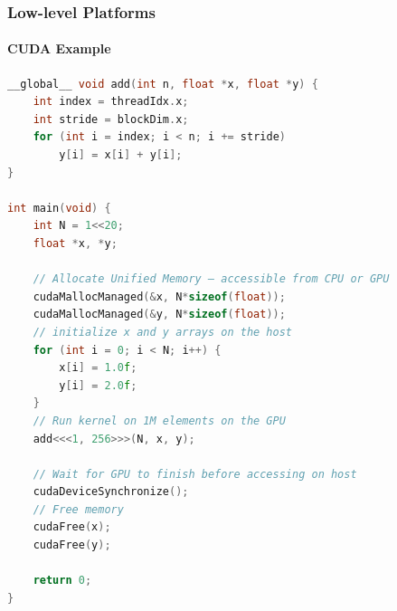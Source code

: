 \documentclass[aspectratio=1610]{beamer}
\begin{document}
\begin{frame}[fragile]
    \frametitle{Low-level Platforms}
    \framesubtitle{CUDA Example}
    
    \begin{lstlisting}[language=C++, basicstyle=\ttfamily\upshape\tiny]
__global__ void add(int n, float *x, float *y) {
    int index = threadIdx.x;
    int stride = blockDim.x;
    for (int i = index; i < n; i += stride)
        y[i] = x[i] + y[i];
}

int main(void) {
    int N = 1<<20;
    float *x, *y;
    
    // Allocate Unified Memory – accessible from CPU or GPU
    cudaMallocManaged(&x, N*sizeof(float)); 
    cudaMallocManaged(&y, N*sizeof(float));
    // initialize x and y arrays on the host
    for (int i = 0; i < N; i++) {
        x[i] = 1.0f;
        y[i] = 2.0f;
    }
    // Run kernel on 1M elements on the GPU
    add<<<1, 256>>>(N, x, y);
    
    // Wait for GPU to finish before accessing on host
    cudaDeviceSynchronize();
    // Free memory
    cudaFree(x); 
    cudaFree(y);
    
    return 0;
}
    \end{lstlisting}
    \vspace{-0.5em}
\end{frame}
\end{document}
